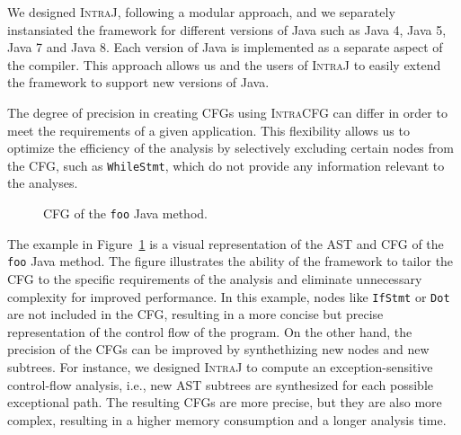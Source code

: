 We designed \textsc{IntraJ}, following a  modular approach, and we separately
instansiated the framework for different versions of Java such as Java 4,
Java 5, Java 7 and Java 8. Each version of Java is implemented as a separate
aspect of the compiler. This approach allows us and the users of \textsc{IntraJ}
to easily extend the framework to support new versions of Java.

The degree of precision in creating CFGs using \textsc{IntraCFG} can differ in order
to meet the requirements of a given application.
This flexibility allows us to optimize the efficiency of the analysis by selectively
excluding certain nodes from the CFG, such as \texttt{WhileStmt}, which do not
provide any information relevant to the analyses.
\begin{figure}[H]
	\centering
	\caption{\label{fig:CFG} CFG of the \texttt{foo} Java method.}
\end{figure}

The example in Figure~\ref{fig:CFG} is a visual representation of the AST and CFG of the
\texttt{foo} Java method. The figure illustrates the ability of the framework to tailor the CFG
to the specific requirements of the analysis and eliminate unnecessary complexity for improved performance.
In this example, nodes like \texttt{IfStmt} or \texttt{Dot} are not included in the CFG,
resulting in a more concise but precise representation of the control flow of the program.
On the other hand, the precision of the CFGs can be improved by synthethizing new nodes and new subtrees.
For instance, we designed \textsc{IntraJ} to compute an exception-sensitive
control-flow analysis, i.e., new AST subtrees are synthesized for each possible exceptional path.
The resulting CFGs are more precise, but they are also more complex, resulting
in a higher memory consumption and a longer analysis time.



